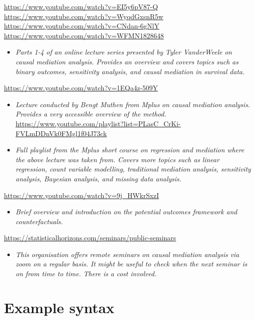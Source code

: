 \documentclass[
]{book}
\providecommand{\tightlist}{%
  \setlength{\itemsep}{0pt}\setlength{\parskip}{0pt}}
\begin{document}
\url{https://www.youtube.com/watch?v=EI5y6pV87-Q}
\url{https://www.youtube.com/watch?v=WyqdGxsnR5w}
\url{https://www.youtube.com/watch?v=CNdan-6gNlY}
\url{https://www.youtube.com/watch?v=WFMN1828648}

\begin{itemize}
\tightlist
\item
  \emph{Parts 1-4 of an online lecture series presented by Tyler VanderWeele on causal mediation analysis. Provides an overview and covers topics such as binary outcomes, sensitivity analysis, and causal mediation in survival data.}
\end{itemize}

\url{https://www.youtube.com/watch?v=1EQa4z-509Y}

\begin{itemize}
\item
  \emph{Lecture conducted by Bengt Muthen from Mplus on causal mediation analysis. Provides a very accessible overview of the method.}
  \url{https://www.youtube.com/playlist?list=PLasC_CrKi-FVLmDDnVk0FMgl1f04J73ck}
\item
  \emph{Full playlist from the Mplus short course on regression and mediation where the above lecture was taken from. Covers more topics such as linear regression, count variable modelling, traditional mediation analysis, sensitivity analysis, Bayesian analysis, and missing data analysis.}
\end{itemize}

\url{https://www.youtube.com/watch?v=9j_HWkrSxzI}

\begin{itemize}
\tightlist
\item
  \emph{Brief overview and introduction on the potential outcomes framework and counterfactuals.}
\end{itemize}

\url{https://statisticalhorizons.com/seminars/public-seminars}

\begin{itemize}
\tightlist
\item
  \emph{This organisation offers remote seminars on causal mediation analysis via zoom on a regular basis. It might be useful to check when the next seminar is on from time to time. There is a cost involved.}
\end{itemize}

\hypertarget{example-syntax-1}{%
\section{Example syntax}\label{example-syntax-1}}
\end{document}

